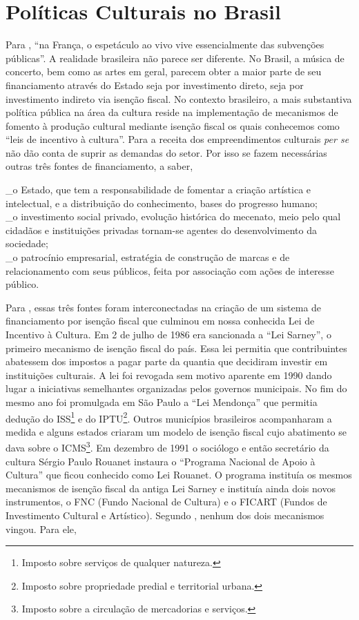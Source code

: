 \documentclass[a4paper, 12pt, openright, oneside, german, french, english, brazil]{abntex2}
\begin{document}
	\section{Políticas Culturais no Brasil}
	
	Para , ``na França, o espetáculo ao vivo vive essencialmente das subvenções públicas''. A realidade brasileira não parece ser diferente. No Brasil, a música de concerto, bem como as artes em geral, parecem obter a maior parte de seu financiamento através do Estado seja por investimento direto, seja por investimento indireto via isenção fiscal. No contexto brasileiro, a mais substantiva política pública na área da cultura reside na implementação de mecanismos de fomento à produção cultural mediante isenção fiscal os quais conhecemos como ``leis de incentivo à cultura''. Para  a receita dos empreendimentos culturais \textit{per se} não dão conta de suprir as demandas do setor. Por isso se fazem necessárias outras três fontes de financiamento, a saber, 
	
	\begin{citacao}
		\_o Estado, que tem a responsabilidade de fomentar a criação artística e intelectual, e a distribuição do conhecimento, bases do progresso humano;\\
		\_o investimento social privado, evolução histórica do mecenato, meio pelo qual cidadãos e instituições privadas tornam-se agentes do desenvolvimento da sociedade;\\
		\_o patrocínio empresarial, estratégia de construção de marcas e de relacionamento com
		seus públicos, feita por associação com ações de interesse público. \cite[p. 22]{sarkovas2005incentivo}
	\end{citacao}
	
	Para , essas três fontes foram interconectadas na criação de um sistema de financiamento por isenção fiscal que culminou em nossa conhecida Lei de Incentivo à Cultura. Em 2 de julho de 1986 era sancionada a ``Lei Sarney'', o primeiro mecanismo de isenção fiscal do país. Essa lei permitia que contribuintes abatessem dos impostos a pagar parte da quantia que decidiram investir em instituições culturais. A lei foi revogada sem motivo aparente em 1990 dando lugar a iniciativas semelhantes organizadas pelos governos municipais. No fim do mesmo ano foi promulgada em São Paulo a ``Lei Mendonça'' que permitia dedução do ISS\footnote{Imposto sobre serviços de qualquer natureza.} e do IPTU\footnote{Imposto sobre propriedade predial e territorial urbana.}. Outros municípios brasileiros acompanharam a medida e alguns estados criaram um modelo de isenção fiscal cujo abatimento se dava sobre o ICMS\footnote{Imposto sobre a circulação de mercadorias e serviços.}. Em dezembro de 1991 o sociólogo e então secretário da cultura Sérgio Paulo Rouanet instaura o ``Programa Nacional de Apoio à Cultura'' que ficou conhecido como Lei Rouanet. O programa instituía os mesmos mecanismos de isenção fiscal da antiga Lei Sarney e instituía ainda dois novos instrumentos, o FNC (Fundo Nacional de Cultura) e o FICART (Fundos de Investimento Cultural e Artístico). Segundo , nenhum dos dois mecanismos vingou. Para ele,
	
\end{document}
